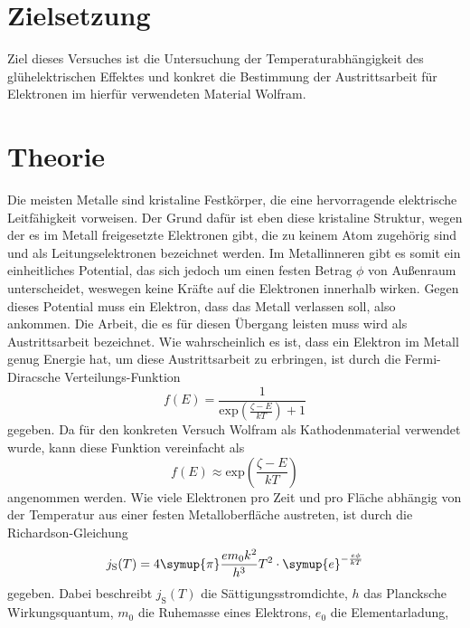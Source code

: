 \section{Zielsetzung}
Ziel dieses Versuches ist die Untersuchung der Temperaturabhängigkeit des glühelektrischen Effektes und konkret die Bestimmung der Austrittsarbeit für Elektronen im
hierfür verwendeten Material Wolfram.

\section{Theorie}
\label{sec:Theorie}

Die meisten Metalle sind kristaline Festkörper, die eine hervorragende elektrische Leitfähigkeit vorweisen. Der Grund dafür ist eben diese kristaline Struktur, wegen
der es im Metall freigesetzte Elektronen gibt, die zu keinem Atom zugehörig sind und als Leitungselektronen bezeichnet werden. Im Metallinneren gibt es somit ein
einheitliches Potential, das sich jedoch um einen festen Betrag $\phi$ von Außenraum unterscheidet, weswegen keine Kräfte auf die Elektronen innerhalb wirken.
\newline
Gegen dieses Potential muss ein Elektron, dass das Metall verlassen soll, also ankommen. Die Arbeit, die es für diesen Übergang leisten muss wird als Austrittsarbeit
bezeichnet. Wie wahrscheinlich es ist, dass ein Elektron im Metall genug Energie hat, um diese Austrittsarbeit zu erbringen, ist durch die Fermi-Diracsche
Verteilungs-Funktion 
\begin{equation}
    \label{eqn:Fermi_Dirac1}
    f(E) = \frac{1}{\mathrm{exp}\left( \frac{\zeta - E}{kT} \right) + 1}
\end{equation}
gegeben. Da für den konkreten Versuch Wolfram als Kathodenmaterial verwendet wurde, kann diese Funktion vereinfacht als
\begin{equation}
    \label{eqn:Fermi_Dirac2}
    f(E) \approx \mathrm{exp}\left( \frac{\zeta - E}{kT} \right)
\end{equation}
angenommen werden.
\noindent
Wie viele Elektronen pro Zeit und pro Fläche abhängig von der Temperatur aus einer festen Metalloberfläche austreten, ist durch die Richardson-Gleichung 
\begin{equation}
    j_\text{S}(T) = 4 \symup{\pi}\frac{e m_0 k^2}{h^3}T^2 \cdot \symup{e}^{-\frac{e\phi}{kT}}
    \label{eqn:J_S}
\end{equation}
gegeben. Dabei beschreibt $j_\text{S}(T)$ die Sättigungsstromdichte, $h$ das Plancksche Wirkungsquantum, $m_0$ die Ruhemasse eines Elektrons, $e_0$ die Elementarladung,
